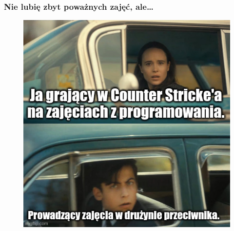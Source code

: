 \documentclass[10pt,t]{beamer}
\begin{document}
\begin{frame}
  \frametitle{Nie lubię zbyt poważnych zajęć, ale\ldots}

  \vspace{-0.5em}


  \begin{figure}

    \label{fig:Jak-to-bywa-na-zajeciach}

    \centering


    \includegraphics[scale=0.42]
    {./Presentations-pictures/Jak-to-bywa-na-zajeciach.jpeg}

  \end{figure}

\end{frame}
\end{document}
